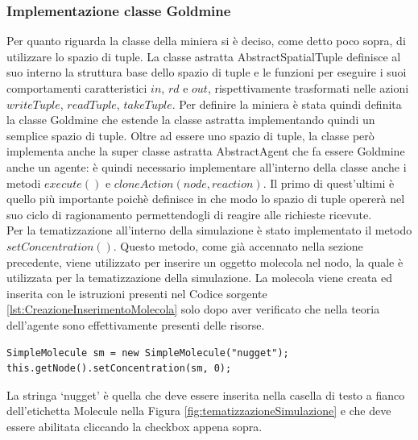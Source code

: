 \subsubsection{Implementazione classe Goldmine}
Per quanto riguarda la classe della miniera si è deciso, come detto poco sopra, di utilizzare lo spazio di tuple. La classe astratta AbstractSpatialTuple definisce al suo interno la struttura base dello spazio di tuple e le funzioni per eseguire i suoi comportamenti caratteristici $in$, $rd$ e $out$, rispettivamente trasformati nelle azioni $writeTuple$, $readTuple$, $takeTuple$.
Per definire la miniera è stata quindi definita la classe Goldmine che estende la classe astratta implementando quindi un semplice spazio di tuple.
Oltre ad essere uno spazio di tuple, la classe però implementa anche la super classe astratta AbstractAgent che fa essere Goldmine anche un agente: è quindi necessario implementare all'interno della classe anche i metodi $execute()$ e $cloneAction(node, reaction)$. Il primo di quest'ultimi è quello più importante poichè definisce in che modo lo spazio di tuple opererà nel suo ciclo di ragionamento permettendogli di reagire alle richieste ricevute.
\\
Per la tematizzazione all'interno della simulazione è stato implementato il metodo $setConcentration()$. Questo metodo, come già accennato nella sezione precedente, viene utilizzato per inserire un oggetto molecola nel nodo, la quale è utilizzata per la tematizzazione della simulazione. La molecola viene creata ed inserita con le istruzioni presenti nel Codice sorgente \ref{lst:CreazioneInserimentoMolecola} solo dopo aver verificato che nella teoria dell'agente sono effettivamente presenti delle risorse.
\medskip
\begin{lstlisting}[firstnumber=1,label={lst:CreazioneInserimentoMolecola},caption={Creazione e inserimento molecola}]
SimpleMolecule sm = new SimpleMolecule("nugget");
this.getNode().setConcentration(sm, 0);
\end{lstlisting}
La stringa `nugget' è quella che deve essere inserita nella casella di testo a fianco dell'etichetta Molecule nella Figura \ref{fig:tematizzazioneSimulazione} e che deve essere abilitata cliccando la checkbox appena sopra.
\newline

